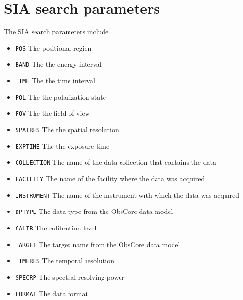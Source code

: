 \documentclass{article}
\begin{document}
\section{SIA search parameters}
\noindent
The SIA search parameters include
\begin{itemize}
  \item \texttt{POS}  The positional region
  \item \texttt{BAND} The the energy interval
  \item \texttt{TIME} The the time interval
  \item \texttt{POL}  The the polarization state
  \item \texttt{FOV}  The the field of view
  \item \texttt{SPATRES} The the spatial resolution
  \item \texttt{EXPTIME} The the exposure time
  \item \texttt{COLLECTION} The name of the data collection that contains the data
  \item \texttt{FACILITY} The name of the facility where the data was acquired
  \item \texttt{INSTRUMENT} The name of the instrument with which the data was acquired
  \item \texttt{DPTYPE} The data type from the ObsCore
   data model
  \item \texttt{CALIB} The calibration level
  \item \texttt{TARGET} The target name from the ObsCore
   data model
  \item \texttt{TIMERES} The temporal resolution
  \item \texttt{SPECRP} The spectral resolving power
  \item \texttt{FORMAT} The data format
\end{itemize}



\theendnotes
\end{document}
